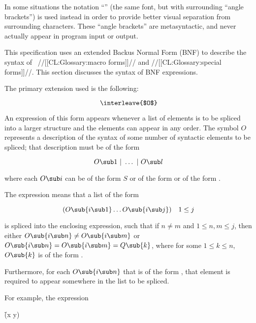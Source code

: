 In some situations the notation ``'' (\ie the same font, but with surrounding ``angle brackets'') is used instead in order to provide better visual separation from surrounding characters.  These ``angle brackets'' are metasyntactic, and never actually appear in program input or output.

\endlist

\endsubsubsection%

 

This specification uses an extended Backus Normal Form (BNF) to describe the syntax of \clisp\ //[[CL:Glossary:macro forms]]// and //[[CL:Glossary:special forms]]//. This section discusses the syntax of BNF expressions.


The primary extension used is the following:

$$\hbox{\interleave{$O$}}$$

An expression of this form appears whenever a list of elements is to be spliced into a larger structure and the elements can appear in any order. The symbol $O$ represents a description of the syntax of some number of syntactic elements to be spliced; that description must be of the form

$$O\sub 1\ \vert\ \ldots\ \vert\ O\sub l$$

 \noindent where each $O\sub i$ can be of the form $S$ or of the form  or of the form .

The expression  means that a list of the form

$$(O\sub{i\sub 1}\ldots O\sub{i\sub j})\quad 1\leq j$$

\noindent is spliced into the enclosing expression, such that if $n \neq m$ and $1\leq n,m\leq j$, then either $O\sub{i\sub n}\neq O\sub{i\sub m}$
         or $O\sub{i\sub n} = O\sub{i\sub m} = Q\sub{k}$,  where for some $1\leq k \leq n$, $O\sub{k}$ is of the form . 

Furthermore, for each $O\sub{i\sub n}$ that is of the form , that element is required to appear somewhere in the list to be spliced.

For example, the expression

\f{(x  y)}


